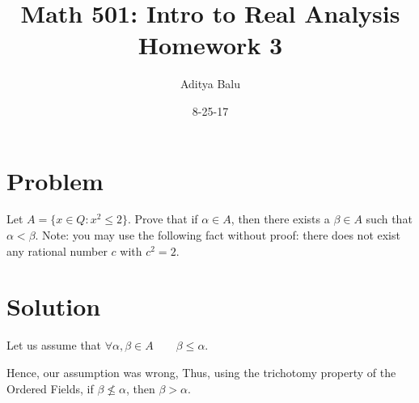 \documentclass[]{article}
\title{Math 501: Intro to Real Analysis\\Homework 3}
\date{8-25-17}
\author{Aditya Balu}
\begin{document}
\maketitle

\section*{Problem}
Let $A = \{x \in \mathit{Q} : x^2 \leq 2 \}$. Prove that if $\alpha \in A$, then there exists a $\beta \in A$ such that $\alpha < \beta$. Note: you may use the following fact without proof: there does not exist any rational number $c$ with $c^2 = 2$.

\section*{Solution}
Let us assume that $\forall \alpha , \beta \in A \qquad \beta \leq \alpha$.



Hence, our assumption was wrong, Thus, using the trichotomy property of the Ordered Fields, if $\beta \not\leq \alpha$, then $\beta > \alpha$.
\end{document}

